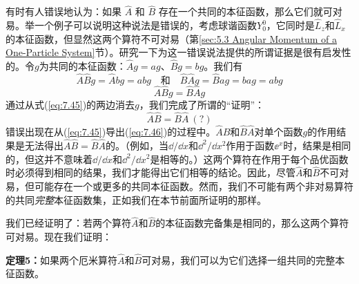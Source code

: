     有时有人错误地认为：如果 $\hat{A}$ 和 $\hat{B}$ 存在一个共同的本征函数，那么它们就可对易。举一个例子可以说明这种说法是错误的，考虑球谐函数$Y_0^0$，它同时是$\hat{L}_z$和$\hat{L}_x$的本征函数，但显然这两个算符不可对易（第\ref{sec:5.3 Angular Momentum of a One-Particle System}节）。研究一下为这一错误说法提供的所谓证据是很有启发性的。令$g$为共同的本征函数：$\hat{A}g = ag$、$\hat{B}g = bg$。我们有
    \begin{equation*}
        \hat{A}\hat{B}g = \hat{A}bg = abg \quad \text{和} \quad \hat{B}\hat{A}g = \hat{B}ag = bag = abg
    \end{equation*}
    \begin{equation}
        \hat{A}\hat{B}g = \hat{B}\hat{A}g
        \label{eq:7.45}
    \end{equation}
    通过从式(\ref{eq:7.45})的两边消去$g$，我们完成了所谓的“证明”：
    \begin{equation}
        \hat{A}\hat{B} = \hat{B}\hat{A}\:(?)
        \label{eq:7.46}
    \end{equation}
    错误出现在从(\ref{eq:7.45})导出(\ref{eq:7.46})的过程中。$\hat{A}\hat{B}$和$\hat{B}\hat{A}$对单个函数$g$的作用结果是无法得出$\hat{A}\hat{B} = \hat{B}\hat{A}$的。（例如，当$\dd /\dd x$和$\dd ^2/\dd x^2$作用于函数$\ee ^x$时，结果是相同的，但这并不意味着$\dd /\dd x$和$\dd ^2/\dd x^2$是相等的。）这两个算符在作用于每个品优函数时必须得到相同的结果，我们才能得出它们相等的结论。因此，尽管$\hat{A}$和$\hat{B}$不可对易，但可能存在一个或更多的共同本征函数。然而，我们不可能有两个非对易算符的共同\textit{完整}本征函数集，正如我们在本节前面所证明的那样。

    我们已经证明了：若两个算符$\hat{A}$和$\hat{B}$的本征函数完备集是相同的，那么这两个算符可对易。现在我们证明：
    \begin{center}
        \parbox{0.8\textwidth}{
            \textbf{定理5：}如果两个厄米算符$\hat{A}$和$\hat{B}$可对易，我们可以为它们选择一组共同的完整本征函数。
        }
    \end{center}

